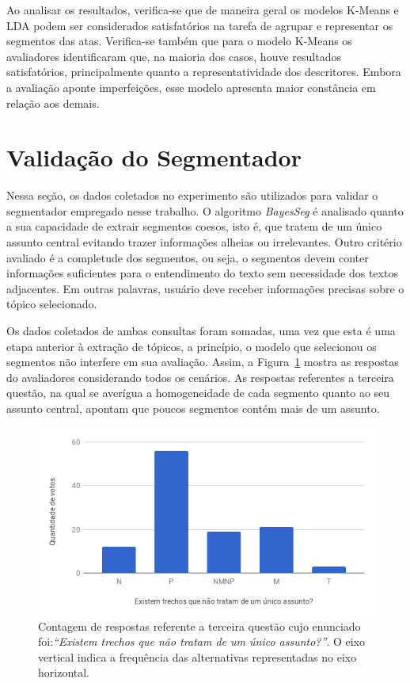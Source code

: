 Ao analisar os resultados, verifica-se que de maneira geral os modelos K-Means e LDA podem ser considerados satisfatórios na tarefa de agrupar e representar os segmentos das atas.
Verifica-se também que para o modelo K-Means os avaliadores identificaram que, na maioria dos casos, houve resultados satisfatórios, principalmente quanto a representatividade dos descritores. Embora a avaliação aponte imperfeições, esse modelo apresenta maior 
constância em relação aos demais.

\section{Validação do Segmentador}

Nessa seção, os dados coletados no experimento são utilizados para validar o segmentador empregado nesse trabalho. O algoritmo \textit{BayesSeg} é analisado quanto a sua capacidade de extrair segmentos coesos, isto é, que tratem de um único assunto central evitando trazer informações alheias ou irrelevantes. Outro critério avaliado é a completude dos segmentos, ou seja, o segmentos devem conter informações suficientes para o entendimento do texto sem necessidade dos textos adjacentes. Em outras palavras, usuário deve receber informações precisas sobre o tópico selecionado.

Os dados coletados de ambas consultas foram somadas, uma vez que esta é uma etapa anterior à extração de tópicos, a princípio, o modelo que selecionou os segmentos não interfere em sua avaliação. Assim, a Figura~\ref{fig:Q3} mostra as respostas do avaliadores considerando todos os cenários. As respostas referentes a terceira questão, na qual se averígua a homogeneidade de cada segmento quanto ao seu assunto central, apontam que poucos segmentos contém mais de um assunto.

\begin{figure}[!h] \centering     %

		\includegraphics[width=.48\textwidth]{conteudo/capitulos/figs/figuras-experimento/Q3-Seg.png}
	\caption{Contagem de respostas referente a terceira questão cujo enunciado foi:\textit{``Existem trechos que não tratam de um único assunto?''}. O eixo vertical indica a frequência das alternativas representadas no eixo horizontal. }
	\label{fig:Q3}
\end{figure}


